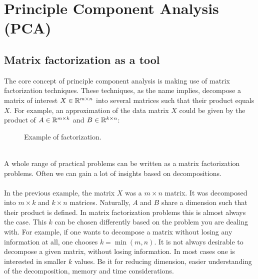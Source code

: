 \renewcommand{\this}{PCA}

\chapter{Principle Component Analysis (PCA)}
\section{Matrix factorization as a tool}
The core concept of principle component analysis is 
making use of matrix factorization techniques. These 
techniques, as the name implies, decompose a matrix 
of interest $X \in \mathbb{R}^{m \times n}$ into several 
matrices such that their product equals $X$. For 
example, an approximation of the data matrix $X$ 
could be given by the product of 
$A \in \mathbb{R}^{m \times k}$ and $B \in \mathbb{R}^{k \times n}$:
\\
\begin{figure}[h!]
	\centering	
	\label{approx}
	\caption{Example of factorization.}
\end{figure}\\
A whole range of practical problems can be written
as a matrix factorization problems. Often we can 
gain a lot of insights based on decompositions.
\\\\
In the previous example, the matrix $X$ was a $m \times n$ matrix. 
It was decomposed into $m \times k$ and $k \times n$ matrices. 
Naturally, $A$ and $B$ share a dimension such that their product
is defined. In matrix factorization problems this is almost always
the case. This $k$ can be chosen differently based on the problem 
you are dealing with. For example, if one wants to decompose a 
matrix without losing any information at all, one chooses 
$k = \min(m, n)$. It is not always desirable to decompose a 
given matrix, without losing information. In most cases one is
interested in smaller $k$ values. Be it for reducing dimension, 
easier understanding of the decomposition, memory and time 
considerations.

